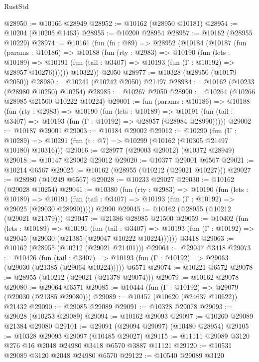 \begin{lexlean}{RustStd}
\begin{coremodule}
@28950 := @10166 @28949
@28952 := @10162 (@28950 @10181)
@28954 := @10204 (@10205 @1463)
@28955 := @10200 @28954
@28957 := @10162 (@28955 @10229)
@28974 := @10161
    (fun (fn : @89) =>
    @28952
      (@10184
        (@10187
          (fun (params : @10186) =>
          @10188
            (fun (rty : @2983) =>
            @10190
              (fun (lets : @10189) =>
              @10191 (fun (tail : @3407) => @10193 (fun (Γ : @10192) => @28957 @10276))))))
        @10322))
    @2050
@28977 := @10328 (@28950 (@10179 @2050))
@28980 := @10241 (@10242 @2050) @21497
@28984 := @10162 (@10233 (@28980 @10250) @10254)
@28985 := @10267 @2050
@28990 := @10264 (@10266 @28985 @21500 @10222 @10224)
@29001 := fun (params : @10186) =>
  @10188
    (fun (rty : @2983) =>
    @10190
      (fun (lets : @10189) =>
      @10191 (fun (tail : @3407) => @10193 (fun (Γ : @10192) => @28957 (@28984 @28990)))))
@29002 := @10187 @29001
@29003 := @10184 @29002
@29012 := @10290
    (fun (U : @10289) => @10291 (fun (t : @7) => @10299 (@10162 (@10305 @21497 @10180) @10316)))
@29016 := @28977 (@29003 @29012) (@10372 @28949)
@29018 := @10147 @29002 @29012
@29020 := @10377 @29001 @6567
@29021 := @10214 @6567
@29025 := @10162 (@28955 (@10212 (@29021 @10227)))
@29027 := @28980 (@10249 @6567)
@29028 := @10233 @29027
@29030 := @10162 (@29028 @10254)
@29041 := @10380
    (fun (rty : @2983) =>
    @10190
      (fun (lets : @10189) =>
      @10191 (fun (tail : @3407) => @10193 (fun (Γ : @10192) => @29025 (@29030 @28990)))))
    @2990
@29045 := @10162 (@28955 (@10212 (@29021 @21379)))
@29047 := @21386 @28985 @21500
@29059 := @10402
    (fun (lets : @10189) =>
    @10191
      (fun (tail : @3407) =>
      @10193 (fun (Γ : @10192) => @29045 (@29030 (@21385 (@29047 @10222 @10224))))))
    @3418
@29063 := @10162 (@28955 (@10212 (@29021 @21401)))
@29064 := @29047 @3418
@29073 := @10426
    (fun (tail : @3407) => @10193 (fun (Γ : @10192) => @29063 (@29030 (@21385 (@29064 @10224)))))
    @6571
@29074 := @10221 @6572
@29078 := @28955 (@10212 (@29021 (@21378 @29074)))
@29079 := @10162 @29078
@29080 := @29064 @6571
@29085 := @10444 (fun (Γ : @10192) => @29079 (@29030 (@21385 @29080)))
@29089 := @10457 (@10620 (@24637 @10622)) @21432
@29090 := @29085 @29089
@29091 := @10328 @29078
@29093 := @29028 (@10253 @29089)
@29094 := @10162 @29093
@29097 := @10260 @29089 @21384 @29080
@29101 := @29091 (@29094 @29097) (@10480 @28954)
@29105 := @10328 @29093 @29097 (@10485 @29027)
@29115 := @11111 @29089 @3120 @276 @16 @2048 @24980 @3418 @6570 @3887 @11121
@29120 := @10531 @29089 @3120 @2048 @24980 @6570
@29122 := @10540 @29089 @3120

\end{coremodule}
\end{lexlean}
